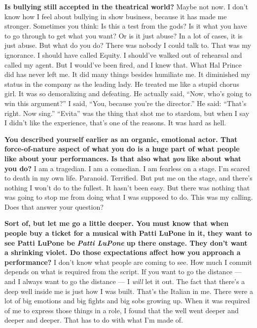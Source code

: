 \textbf{Is bullying still accepted in the theatrical world?} Maybe not
now. I don't know how I feel about bullying in show business, because it
has made me stronger. Sometimes you think: Is this a test from the gods?
Is it what you have to go through to get what you want? Or is it just
abuse? In a lot of cases, it is just abuse. But what do you do? There
was nobody I could talk to. That was my ignorance. I should have called
Equity. I should've walked out of rehearsal and called my agent. But I
would've been fired, and I knew that. What Hal Prince did has never left
me. It did many things besides humiliate me. It diminished my status in
the company as the leading lady. He treated me like a stupid chorus
girl. It was so demoralizing and defeating. He actually said, ``Now,
who's going to win this argument?'' I said, ``You, because you're the
director.'' He said: ``That's right. Now sing.'' ``Evita'' was the thing
that shot me to stardom, but when I say I didn't like the experience,
that's one of the reasons. It was hard as hell.

\textbf{You described yourself earlier as an organic, emotional actor.
That force-of-nature aspect of what you do is a huge part of what people
like about your performances. Is that also what} \emph{\textbf{you}}
\textbf{like about what you do?} I am a tragedian. I am a comedian. I am
fearless on a stage. I'm scared to death in my own life. Paranoid.
Terrified. But put me on the stage, and there's nothing I won't do to
the fullest. It hasn't been easy. But there was nothing that was going
to stop me from doing what I was supposed to do. This was my calling.
Does that answer your question?

\textbf{Sort of, but let me go a little deeper. You must know that when
people buy a ticket for a musical with Patti LuPone in it, they want to
see Patti LuPone be} \emph{\textbf{Patti LuPone}} \textbf{up there
onstage. They don't want a shrinking violet. Do those expectations
affect how you approach a performance?} I don't know what people are
coming to see. How much I commit depends on what is required from the
script. If you want to go the distance --- and I always want to go the
distance --- I \emph{will} let it out. The fact that there's a deep well
inside me is just how I was built. That's the Italian in me. There were
a lot of big emotions and big fights and big sobs growing up. When it
was required of me to express those things in a role, I found that the
well went deeper and deeper and deeper. That has to do with what I'm
made of.

